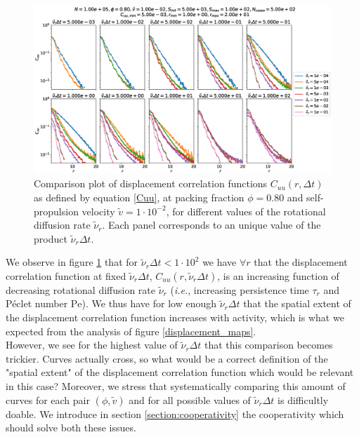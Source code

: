 \documentclass[class=report, float=false, crop=false]{standalone}
\begin{document}
\begin{figure}[h!]
\centering
\includegraphics[width=\textwidth]{figures/figs/Cuu_comparison_Dk8000_Vj1000_Nq1000_Cn5000_LINLOG.eps}
\caption{Comparison plot of displacement correlation functions $C_{uu}(r, \Delta t)$ as defined by equation \ref{Cuu}, at packing fraction $\phi = 0.80$ and self-propulsion velocity $\tilde{v} = 1\cdot10^{-2}$, for different values of the rotational diffusion rate $\tilde{\nu}_r$. Each panel corresponds to an unique value of the product $\tilde{\nu}_r\Delta t$.}
\label{cuu_comparison}
\end{figure}

We observe in figure \ref{cuu_comparison} that for $\tilde{\nu}_r\Delta t < 1\cdot10^2$ we have $\forall r$ that the displacement correlation function at fixed $\tilde{\nu}_r \Delta t$, $C_{uu}(r, \tilde{\nu}_r \Delta t)$, is an increasing function of decreasing rotational diffusion rate $\tilde{\nu}_r$ (\textit{i.e.}, increasing persistence time $\tau_r$ and P\'eclet number $\text{Pe}$). We thus have for low enough $\tilde{\nu}_r\Delta t$ that the spatial extent of the displacement correlation function increases with activity, which is what we expected from the analysis of figure \ref{displacement_maps}.\\

However, we see for the highest value of $\tilde{\nu}_r\Delta t$ that this comparison becomes trickier. Curves actually cross, so what would be a correct definition of the "spatial extent" of the displacement correlation function which would be relevant in this case? Moreover, we stress that systematically comparing this amount of curves for each pair $(\phi, \tilde{v})$ and for all possible values of $\tilde{\nu}_r\Delta t$ is difficultly doable. We introduce in section \ref{section:cooperativity} the cooperativity which should solve both these issues.
\end{document}
